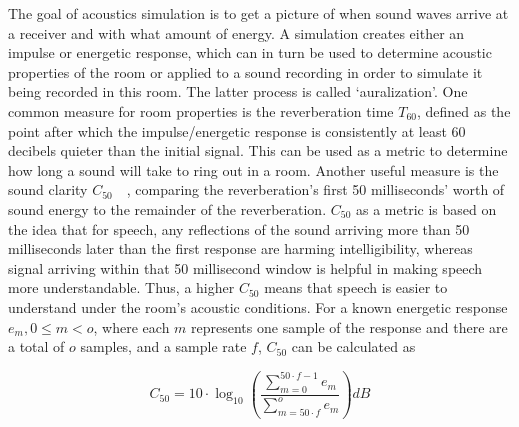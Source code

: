 The goal of acoustics simulation is to get a picture of when sound waves arrive at a receiver and with what amount of energy.
A simulation creates either an impulse or energetic response,
which can in turn be used to determine acoustic properties of the room
or applied to a sound recording in order to simulate it being recorded in this room.
The latter process is called `auralization'.
\newline
One common measure for room properties is the reverberation time \(T_{60}\),
defined as the point after which the impulse/energetic response is consistently at least 60 decibels quieter than the initial signal.
This can be used as a metric to determine how long a sound will take to ring out in a room.
\newline
Another useful measure is the sound clarity \(C_{50}\)~\cite{AB18}~\cite{PMG22},
comparing the reverberation's first 50 milliseconds' worth of sound energy to the remainder of the reverberation.
\(C_{50}\) as a metric is based on the idea that for speech,
any reflections of the sound arriving more than 50 milliseconds later than the first response are harming intelligibility,
whereas signal arriving within that 50 millisecond window is helpful in making speech more understandable.
Thus, a higher \(C_{50}\) means that speech is easier to understand under the room's acoustic conditions.
\newline
For a known energetic response \(e_m, 0 \le m < o\), where each \(m\) represents one sample of the response and there are a total of \(o\) samples,
and a sample rate \(f\), \(C_{50}\) can be calculated as

\begin{equation}\label{eq:C50}
    C_{50} = 10 \cdot \log_{10} \left( \frac{\displaystyle\sum_{m=0}^{50 \cdot f - 1}e_m}{\displaystyle\sum_{m=50 \cdot f}^{o}e_m} \right) dB
\end{equation}

